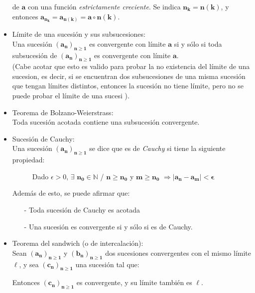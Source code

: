 \documentclass[a4paper,11pt]{report}
\begin{document}
\begin{itemize}
\begin{equation*}
\end{equation*}
de $\mathbf{a}$ con una función \emph{estrictamente creciente}. Se indica $\mathbf{n_k} = \mathbf{n(k)}$, y entonces $\mathbf{a_{n_{k}}} = \mathbf{a_{n(k)}}= \mathbf{a} \circ \mathbf{n(k)}$.
\item Límite de una sucesión y sus subsucesiones: \\
Una sucesión $\mathbf{(a_n)_{n \geqslant 1}}$ es convergente con límite $\mathbf{a}$ si y sólo si toda subsucesión de $\mathbf{(a_n)_{n \geqslant 1}}$ es convergente con límite $\mathbf{a}$. \\
(Cabe acotar que esto es valido para probar la no existencia del límite de una sucesion, es decir, si se encuentran dos subsucesiones de una misma sucesión que tengan límites distintos, entonces la sucesión no tiene límite, pero no se puede probar el límite de una sucesi ).
\item Teorema de Bolzano-Weierstrass: \\
Toda sucesión acotada contiene una subsucesión convergente.
\item Sucesión de Cauchy: \\
Una sucesión $\mathbf{(a_n)_{n \geqslant 1}}$ se dice que es de \emph{Cauchy} si tiene la siguiente propiedad:
\begin{description}
\item[ ] Dado $\epsilon > 0$, $\exists$ $\mathbf{n_0} \in \mathbb{N}$ / $\mathbf{n \geqslant n_0}$ y $\mathbf{m \geqslant n_0}$ $\Longrightarrow \mathbf{|a_n -a_m| < \epsilon}$
\end{description}
Además de esto, se puede afirmar que:
\begin{itemize}
\item[-] Toda sucesión de Cauchy es acotada
\item[-] Una sucesión es convergente si y sólo si es de Cauchy.
\end{itemize}
\item Teorema del sandwich (o de intercalación): \\
 Sean $\mathbf{(a_n)_{n \geqslant 1}}$ y $\mathbf{(b_n)_{n \geqslant 1}}$ dos sucesiones convergentes con el mismo límite $\ell$, y sea $\mathbf{(c_n)_{n \geqslant 1}}$ una sucesión tal que: \\
Entonces  $\mathbf{(c_n)_{n \geqslant 1}}$ es convergente, y su límite también es $\ell$.

\end{itemize}
\end{document}
